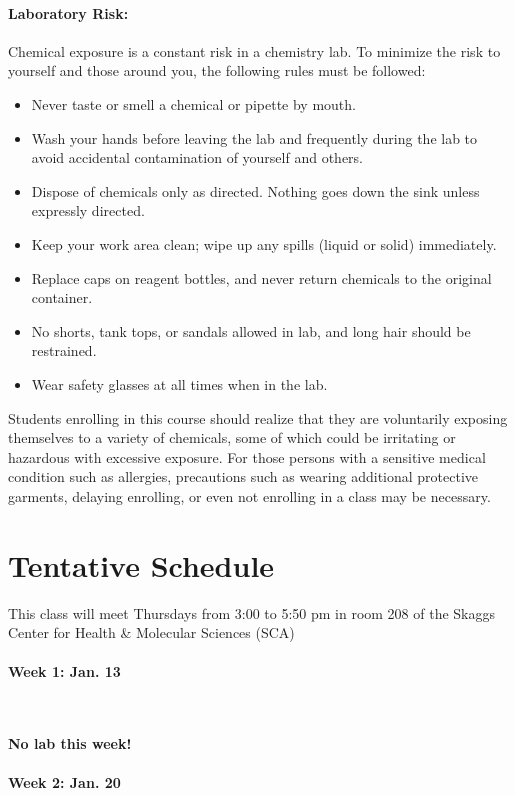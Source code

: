 \documentclass[12pt, letterpaper]{article}
\begin{document}
\paragraph{Laboratory Risk:}
Chemical exposure is a constant risk in a chemistry lab. To minimize the risk to yourself and those around you, the following rules must be followed:
\begin{itemize}
	\item Never taste or smell a chemical or pipette by mouth.
	\item Wash your hands before leaving the lab and frequently during the lab to avoid accidental contamination of yourself and others.
	\item Dispose of chemicals only as directed. Nothing goes down the sink unless expressly directed.
	\item Keep your work area clean; wipe up any spills (liquid or solid) immediately.
	\item Replace caps on reagent bottles, and never return chemicals to the original container.
	\item No shorts, tank tops, or sandals allowed in lab, and long hair should be restrained.
	\item Wear safety glasses at all times when in the lab.
\end{itemize}
Students enrolling in this course should realize that they are voluntarily exposing themselves to a variety of chemicals, some of which could be irritating or hazardous with excessive exposure.  For those persons with a sensitive medical condition such as allergies, precautions such as wearing additional protective garments, delaying enrolling, or even not enrolling in a class may be necessary.

\section*{Tentative Schedule}
This class will meet Thursdays from 3:00 to 5:50 pm in room 208 of the Skaggs Center for Health \& Molecular Sciences (SCA)

\paragraph{Week 1: Jan. 13}~

\textbf{No lab this week!}

\paragraph{Week 2: Jan. 20}~
\end{document}
